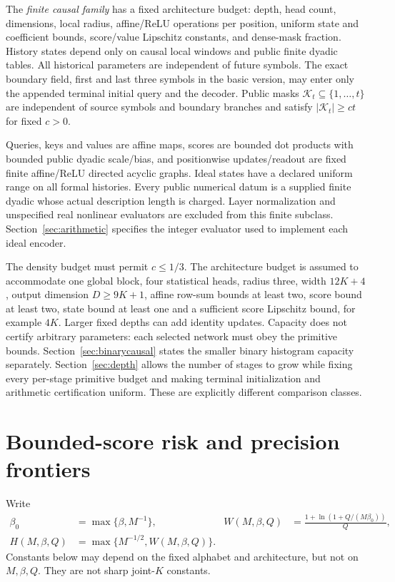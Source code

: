 \documentclass[11pt,letterpaper]{article}
\theoremstyle{definition}\newtheorem{definition}[theorem]{Definition}
\theoremstyle{remark}\newtheorem{remark}[theorem]{Remark}
\newcommand{\betaz}{\beta_0}
\begin{document}
The \emph{finite causal family} has a fixed architecture budget: depth, head count, dimensions, local radius, affine/ReLU operations per position, uniform state and coefficient bounds, score/value Lipschitz constants, and dense-mask fraction. History states depend only on causal local windows and public finite dyadic tables. All historical parameters are independent of future symbols. The exact boundary field, first and last three symbols in the basic version, may enter only the appended terminal initial query and the decoder. Public masks $\mathcal K_t\subseteq\{1,\ldots,t\}$ are independent of source symbols and boundary branches and satisfy $|\mathcal K_t|\ge ct$ for fixed $c>0$.

Queries, keys and values are affine maps, scores are bounded dot products with bounded public dyadic scale/bias, and positionwise updates/readout are fixed finite affine/ReLU directed acyclic graphs. Ideal states have a declared uniform range on all formal histories. Every public numerical datum is a supplied finite dyadic whose actual description length is charged. Layer normalization and unspecified real nonlinear evaluators are excluded from this finite subclass. Section~\ref{sec:arithmetic} specifies the integer evaluator used to implement each ideal encoder.

The density budget must permit $c\le1/3$. The architecture budget is assumed to accommodate one global block, four statistical heads, radius three, width $12K+4$, output dimension $D\ge9K+1$, affine row-sum bounds at least two, score bound at least two, state bound at least one and a sufficient score Lipschitz bound, for example $4K$. Larger fixed depths can add identity updates. Capacity does not certify arbitrary parameters: each selected network must obey the primitive bounds. Section~\ref{sec:binarycausal} states the smaller binary histogram capacity separately. Section~\ref{sec:depth} allows the number of stages to grow while fixing every per-stage primitive budget and making terminal initialization and arithmetic certification uniform. These are explicitly different comparison classes.

\section{Bounded-score risk and precision frontiers}\label{sec:main}
Write
\begin{equation}\label{eq:profile}
 \begin{aligned}
 \betaz&=\max\{\beta,M^{-1}\},&
 W(M,\beta,Q)&=\frac{1+\ln(1+Q/(M\betaz))}{Q},\\
 H(M,\beta,Q)&=\max\{M^{-1/2},W(M,\beta,Q)\}.&&
 \end{aligned}
\end{equation}
Constants below may depend on the fixed alphabet and architecture, but not on $M,\beta,Q$. They are not sharp joint-$K$ constants.
\end{document}
